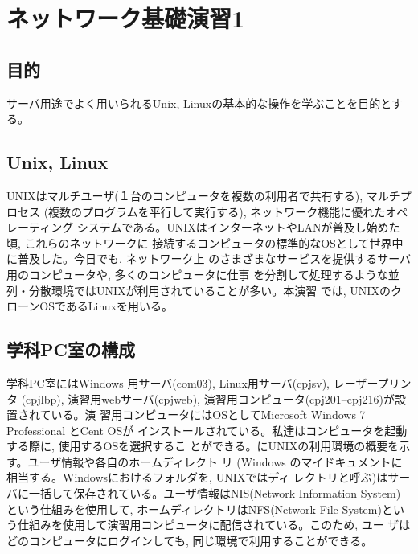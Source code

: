 
\chapter{ネットワーク基礎演習1}
\section{目的}

サーバ用途でよく用いられるUnix, Linuxの基本的な操作を学ぶことを目的とする。

\section{Unix, Linux}

UNIXはマルチユーザ(１台のコンピュータを複数の利用者で共有する), マルチプロセス
(複数のプログラムを平行して実行する), ネットワーク機能に優れたオペレーティング
システムである。UNIXはインターネットやLANが普及し始めた頃, これらのネットワークに
接続するコンピュータの標準的なOSとして世界中に普及した。今日でも, ネットワーク上
のさまざまなサービスを提供するサーバ用のコンピュータや, 多くのコンピュータに仕事
を分割して処理するような並列・分散環境ではUNIXが利用されていることが多い。本演習
では, UNIXのクローンOSであるLinuxを用いる。

\section{学科PC室の構成 }

学科PC室にはWindows 用サーバ(com03), Linux用サーバ(cpjsv), レーザープリンタ
(cpjlbp), 演習用webサーバ(cpjweb), 演習用コンピュータ(cpj201--cpj216)が設置されている。演
習用コンピュータにはOSとしてMicrosoft Windows 7 Professional とCent OSが
インストールされている。私達はコンピュータを起動する際に, 使用するOSを選択するこ
とができる。にUNIXの利用環境の概要を示す。ユーザ情報や各自のホームディレクト
リ (Windows のマイドキュメントに相当する。Windowsにおけるフォルダを, UNIXではディ
レクトリと呼ぶ)はサーバに一括して保存されている。ユーザ情報はNIS(Network
Information System)という仕組みを使用して, ホームディレクトリはNFS(Network File
System)という仕組みを使用して演習用コンピュータに配信されている。このため, ユー
ザはどのコンピュータにログインしても, 同じ環境で利用することができる。

